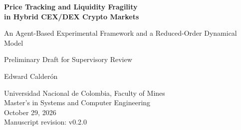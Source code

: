 \documentclass[10pt,a4paper]{article}
\newcommand{\revisionManuscrito}{v0.2.0}
\begin{document}
\begin{center}
  {\LARGE\bfseries Price Tracking and Liquidity Fragility\\
  in Hybrid CEX/DEX Crypto Markets\par}
  \vspace{0.35em}
  {\large An Agent-Based Experimental Framework and a Reduced-Order Dynamical Model\par}
  \vspace{0.35em}
  {\normalsize Preliminary Draft for Supervisory Review\par}
  \vspace{0.8em}
  {\large Edward Calderón\par}
  Universidad Nacional de Colombia, Faculty of Mines\\
  Master's in Systems and Computer Engineering\\
  October 29, 2026\\
  {\small Manuscript revision: \revisionManuscrito}
\end{center}







\appendix


\clearpage
\renewcommand{\refname}{References}


\end{document}

